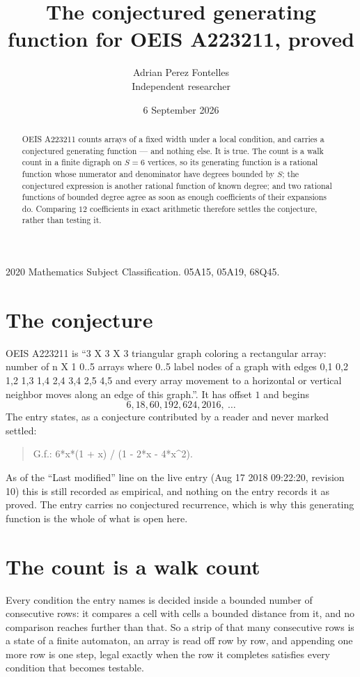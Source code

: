 \documentclass[11pt,a4paper]{article}
\title{The conjectured generating function for OEIS A223211, proved}
\author{Adrian Perez Fontelles\\ \small Independent researcher}
\date{6 September 2026}
\theoremstyle{plain}
\theoremstyle{definition}
\begin{document}
\maketitle

\begin{abstract}
OEIS A223211 counts arrays of a fixed width under a local condition, and carries a conjectured
generating function --- and nothing else. It is true. The count is a walk count in a finite
digraph on $S=6$ vertices, so its generating function is a rational function whose numerator
and denominator have degrees bounded by $S$; the conjectured expression is another rational
function of known degree; and two rational functions of bounded degree agree as soon as enough
coefficients of their expansions do. Comparing $12$ coefficients in exact arithmetic
therefore settles the conjecture, rather than testing it.
\end{abstract}

\noindent\small 2020 Mathematics Subject Classification. 05A15, 05A19, 68Q45.\normalsize

\section{The conjecture}

OEIS A223211 is ``3 X 3 X 3 triangular graph coloring a rectangular array: number of n X 1 0..5 arrays where 0..5 label nodes of a graph with edges 0,1 0,2 1,2 1,3 1,4 2,4 3,4 2,5 4,5 and every array movement to a horizontal or vertical neighbor moves along an edge of this graph.''. It has offset $1$ and begins
\[
6, 18, 60, 192, 624, 2016,\ \dots
\]
The entry states, as a conjecture contributed by a reader and never marked settled:
\begin{quote}
G.f.: 6*x*(1 + x) / (1 - 2*x - 4*x\^{}2).
\end{quote}
As of the ``Last modified'' line on the live entry (Aug 17 2018 09:22:20, revision 10) this is still
recorded as empirical, and nothing on the entry records it as proved. The entry carries no
conjectured recurrence, which is why this generating function is the whole of what is open
here.

\section{The count is a walk count}

Every condition the entry names is decided inside a bounded number of consecutive rows: it
compares a cell with cells a bounded distance from it, and no comparison reaches further than
that. So a strip of that many consecutive rows is a state of a finite automaton, an array is
read off row by row, and appending one more row is one step, legal exactly when the row it
completes satisfies every condition that becomes testable.
\end{document}
